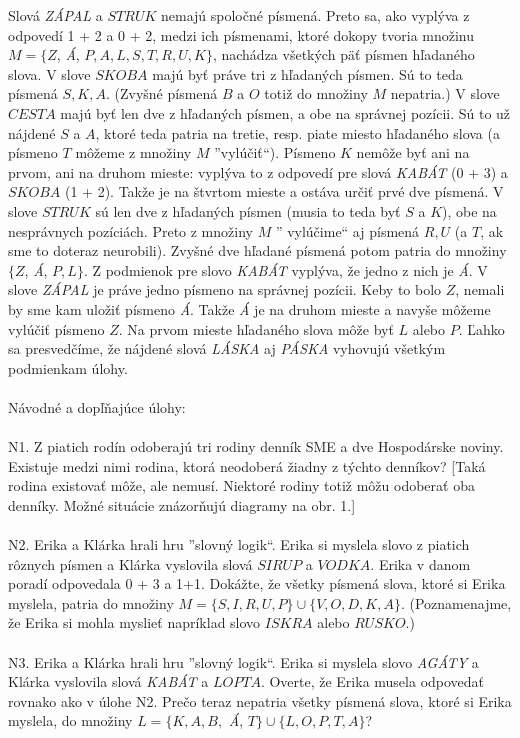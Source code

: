 \rieh Slová \textit{ZÁPAL} a $STRUK$ nemajú spoločné písmená. Preto sa, ako vyplýva z odpovedí 1 + 2 a 0 + 2, medzi ich písmenami, ktoré dokopy tvoria množinu $M= \{Z$, \textit{Á}, $P, A, L, S, T, R, U, K\}$, nachádza všetkých päť písmen hľadaného slova. V slove $SKOBA$ majú byť práve tri z hľadaných písmen. Sú to teda písmená $S, K, A$. (Zvyšné písmená $B$ a $O$ totiž do množiny $M$ nepatria.) V slove $CESTA$ majú byť len dve z hľadaných písmen, a obe na správnej pozícii. Sú to už nájdené $S$ a $A$, ktoré teda patria na tretie, resp. piate miesto hľadaného slova (a písmeno $T$ môžeme z množiny $M$ ”vylúčiť“). Písmeno $K$ nemôže byť ani na prvom, ani na druhom mieste: vyplýva to z odpovedí pre slová \textit{KABÁT} (0 + 3) a $SKOBA$ (1 + 2). Takže je na štvrtom mieste a ostáva určiť prvé dve písmená. V slove $STRUK$ sú len dve z hľadaných písmen (musia
to teda byť $S$ a $K$), obe na nesprávnych pozíciách. Preto z množiny $M$ ” vylúčime“ aj písmená $R, U$ (a $T$, ak sme to doteraz neurobili). Zvyšné dve hľadané písmená potom patria do množiny $\{Z$, \textit{Á}, $P, L\}$. Z podmienok pre slovo \textit{KABÁT} vyplýva, že jedno z nich je \textit{Á}. V slove \textit{ZÁPAL} je práve jedno písmeno na správnej pozícii. Keby to bolo $Z$, nemali by sme kam uložiť písmeno \textit{Á}. Takže \textit{Á} je na druhom mieste a navyše môžeme vylúčiť písmeno $Z$. Na prvom mieste hľadaného slova môže byť $L$ alebo $P$. Ľahko sa presvedčíme, že nájdené slová \textit{LÁSKA} aj \textit{PÁSKA} vyhovujú všetkým podmienkam úlohy.\\
\\
Návodné a dopľňajúce úlohy:\\
\\
N1. Z piatich rodín odoberajú tri rodiny denník SME a dve Hospodárske noviny. Existuje medzi nimi rodina, ktorá neodoberá žiadny z týchto denníkov? [Taká rodina existovať môže, ale nemusí. Niektoré rodiny totiž môžu odoberať oba denníky. Možné situácie znázorňujú diagramy na obr. 1.] \\
\\
N2. Erika a Klárka hrali hru ”slovný logik“. Erika si myslela slovo z piatich rôznych písmen a Klárka vyslovila slová $SIRUP$ a $VODKA$. Erika v danom poradí odpovedala 0 + 3 a 1+1. Dokážte, že všetky písmená slova, ktoré si Erika myslela, patria do množiny $M =\{ S, I, R, U, P\} \cup \{V, O, D, K, A \}$. (Poznamenajme, že Erika si mohla myslieť napríklad slovo $ISKRA$ alebo $RUSKO$.)\\
\\
N3. Erika a Klárka hrali hru ”slovný logik“. Erika si myslela slovo \textit{AGÁTY} a Klárka vyslovila slová \textit{KABÁT} a $LOPTA$. Overte, že Erika musela odpovedať rovnako ako v úlohe N2. Prečo teraz nepatria všetky písmená slova, ktoré si Erika myslela, do množiny $L = \{ K, A, B,$ \textit{Á}, $T\} \cup \{L, O, P, T, A\}$?\\

